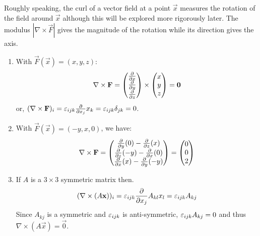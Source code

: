 \documentclass[../main.tex]{subfiles}
\begin{document}
Roughly speaking, the curl of a vector field at a point $\vec{x}$ measures the rotation of the field around $\vec{x}$ although this will be explored more rigorously later.
The modulus $|\nabla \times \vec{F}|$ gives the magnitude of the rotation while its direction gives the axis.
\begin{example}
  \begin{enumerate}
    \item With $\vec{F}(\vec{x}) = (x, y, z)$:
      \[
        \nabla \times \vec{F} = \begin{pmatrix}
        \pderiv{}{x} \\
        \pderiv{}{y} \\
        \pderiv{}{z} \\
        \end{pmatrix} \times \begin{pmatrix}
        x \\
        y \\
        z \\
        \end{pmatrix} = \vec{0}
      \]
      or, $(\nabla \times \vec{F})_i = \levi_{i j k} \pderiv{}{x_j} x_k = \levi_{i j k} \delta_{j k} = 0$.
    \item With $\vec{F}(\vec{x}) = (-y, x, 0)$, we have:
      \[
        \nabla \times \vec{F} = \begin{pmatrix}
        \pderiv{}{y}(0) - \pderiv{}{z}(x) \\
        \pderiv{}{z}(-y) - \pderiv{}{x}(0) \\
        \pderiv{}{x}(x) - \pderiv{}{y}(-y) \\
        \end{pmatrix} =
        \begin{pmatrix}
        0 \\
        0 \\
        2 \\
        \end{pmatrix}
      \]
    \item If $A$ is a $3\times 3$ symmetric matrix then.
      \[
        (\nabla \times (A\vec{x}))_i = \levi_{i j k} \pderiv{}{x_j}A_{k l}x_l = \levi_{i j k} A_{k j}
      \]
      Since $A_{k j}$ is a symmetric and $\varepsilon_{i j k}$ is anti-symmetric, $\varepsilon_{i j k} A_{k j} = 0$ and thus $\nabla \times (A\vec{x}) = \vec{0}$.
  \end{enumerate}
\end{example}
\end{document}
